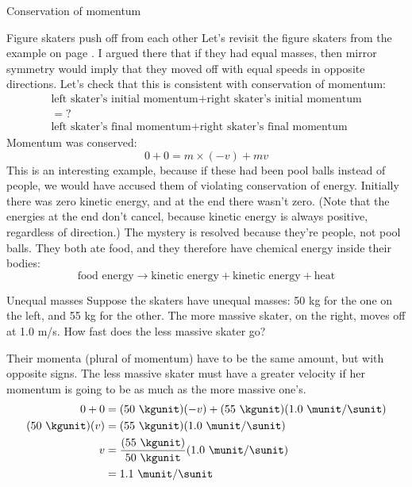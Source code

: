 \begin{envsubsection}{Conservation of momentum}
\begin{eg}{Figure skaters push off from each other}\label{eg:skatersmomentum}
Let's revisit the figure skaters from the example on page
\pageref{original-skaters}. I argued there that if they had equal masses,
then mirror symmetry would imply that they moved off with equal speeds
in opposite directions. Let's check that this is consistent with conservation
of momentum:
\begin{multline*}
	\text{left skater's initial momentum} + \text{right skater's initial momentum}\\
	=? \\
       \text{left skater's final momentum} + \text{right skater's final momentum}
\end{multline*}
Momentum was conserved:
\begin{equation*}
	0+0 = m\times(-v)+mv
\end{equation*}
This is an interesting example, because if these had been pool balls instead
of people, we would have accused them of violating conservation of energy. Initially
there was zero kinetic energy, and at the end there wasn't zero. (Note that the energies
at the end don't cancel, because kinetic energy is always positive, regardless
of direction.) The mystery is resolved because they're people, not pool balls. They
both ate food, and they therefore have chemical energy inside their bodies:
\begin{equation*}
	\text{food energy} \rightarrow \text{kinetic energy} + \text{kinetic energy} + \text{heat}
\end{equation*}
\end{eg}

\begin{eg}{Unequal masses}
\egquestion Suppose the skaters have unequal masses: 50 kg for the one on the left, and 55 kg for
the other. The more massive skater, on the right, moves off at 1.0 m/s. How fast does
the less massive skater go?

\eganswer Their momenta (plural of momentum) have to be the same amount, but with opposite signs.
The less massive skater  must have a greater velocity if her momentum is going to be
as much as the more massive one's.
\begin{align*}
	0+0 &= (50\ \kgunit)(-v)+(55\ \kgunit)(1.0\ \munit/\sunit)\\
	(50\ \kgunit)(v) &= (55\ \kgunit)(1.0\ \munit/\sunit)\\
	v &= \frac{(55\ \kgunit)}{50\ \kgunit}(1.0\ \munit/\sunit)\\
	  &= 1.1\ \munit/\sunit
\end{align*}
\end{eg}
\end{envsubsection}
